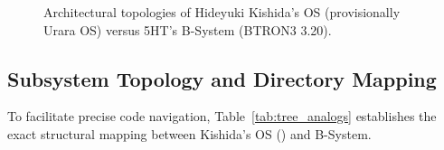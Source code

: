 \documentclass[10pt,journal,compsoc,twocolumn]{article}
\begin{document}
\begin{figure}[t]
\caption{Architectural topologies of Hideyuki Kishida's OS (provisionally Urara OS) versus 5HT's B-System (BTRON3 3.20).}
\label{fig:arch_comparison}
\end{figure}

\subsection{Subsystem Topology and Directory Mapping}
\label{sec:subsystem_topology}
To facilitate precise code navigation, Table~\ref{tab:tree_analogs} establishes the exact structural mapping between Kishida's OS () and B-System.
\end{document}
